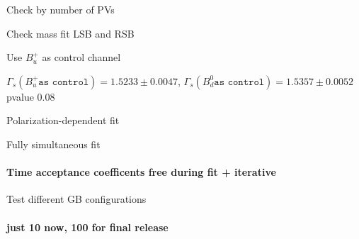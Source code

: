 \documentclass[9pt,xcolor={table,svgnames},aspectratio=43]{beamer}
\makeatletter
\newcommand{\TupleVersion}{v3r0@LcosK}
\newcommand{\TABLES}{/home3/marcos.romero/phis-scq.git/16-welcome-lera/output/tables}
\makeatother
\begin{document}
\begin{frame}{Check by number of PVs}

	  \small\centering
    

\end{frame}


\begin{frame}{Check mass fit  LSB and RSB}

	  \small\centering

\end{frame}



\begin{frame}{\texorpdfstring{Use $B_u^+$ as control channel}{Use Bu}}

	  \small\centering
    
		$\Gamma_s(B_u^+ \texttt{as control}) = 1.5233 \pm 0.0047$,
	$\Gamma_s(B_d^0 \texttt{as control}) = 1.5357 \pm 0.0052$
  pvalue 0.08

\end{frame}


\begin{frame}{Polarization-dependent fit}

  \centering
  \resizebox{0.5\textwidth}{!}{
    
  }

\end{frame}

\begin{frame}{Fully simultaneous fit}
	\framesubtitle{Time acceptance coefficents free during fit + iterative}

	  \small\centering
    

\end{frame}



\begin{frame}{Test different GB configurations}
	\framesubtitle{just 10 now, 100 for final release}


	  \scriptsize\centering

\end{frame}
\end{document}
